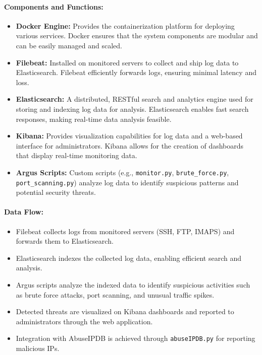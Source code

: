 \documentclass{article}
\begin{document}
    \paragraph{Components and Functions:}
    \begin{itemize}
        \item \textbf{Docker Engine:} Provides the containerization platform for deploying various services.
        Docker ensures that the system components are modular and can be easily managed and scaled.
        \item \textbf{Filebeat:} Installed on monitored servers to collect and ship log data to Elasticsearch.
        Filebeat efficiently forwards logs, ensuring minimal latency and loss.
        \item \textbf{Elasticsearch:} A distributed, RESTful search and analytics engine used for storing and indexing log data for analysis.
        Elasticsearch enables fast search responses, making real-time data analysis feasible.
        \item \textbf{Kibana:} Provides visualization capabilities for log data and a web-based interface for administrators.
        Kibana allows for the creation of dashboards that display real-time monitoring data.
        \item \textbf{Argus Scripts:} Custom scripts (e.g., \texttt{monitor.py}, \texttt{brute\_force.py}, \texttt{port\_scanning.py}) analyze log data to identify suspicious patterns and potential security threats.
    \end{itemize}

    \paragraph{Data Flow:}
    \begin{itemize}
        \item Filebeat collects logs from monitored servers (SSH, FTP, IMAPS) and forwards them to Elasticsearch.
        \item Elasticsearch indexes the collected log data, enabling efficient search and analysis.
        \item Argus scripts analyze the indexed data to identify suspicious activities such as brute force attacks, port scanning, and unusual traffic spikes.
        \item Detected threats are visualized on Kibana dashboards and reported to administrators through the web application.
        \item Integration with AbuseIPDB is achieved through \texttt{abuseIPDB.py} for reporting malicious IPs.
    \end{itemize}
\end{document}

